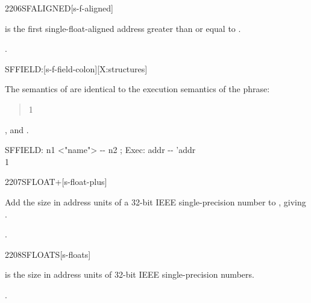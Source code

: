 \begin{worddef}{2206}{SFALIGNED}[s-f-aligned]
\item {}

	 is the first single-float-aligned address greater
	than or equal to .

\see {}.
\end{worddef}


\begin{worddef}{}{SFFIELD:}[s-f-field-colon][X:structures]
\item \stack{}{}

	The semantics of  are identical to the
	execution semantics of the phrase:
	\begin{quote}\ttfamily
		 1  
	\end{quote}

\see {},
	 and
	.

	\begin{implement} %

		\word{:} SFFIELD:\tab{} n1 <"name"> -{}- n2 ; Exec: addr -{}- 'addr \\
		\tab {} 1   \\
		\word{;}
	\end{implement}

\end{worddef}


\begin{worddef}{2207}{SFLOAT+}[s-float-plus]
\item {}

	Add the size in address units of a 32-bit IEEE single-precision
	number to , giving .

\see {}.
\end{worddef}


\begin{worddef}{2208}{SFLOATS}[s-floats]
\item {}

	 is the size in address units of  32-bit IEEE
	single-precision numbers.

\see {}.
\end{worddef}

